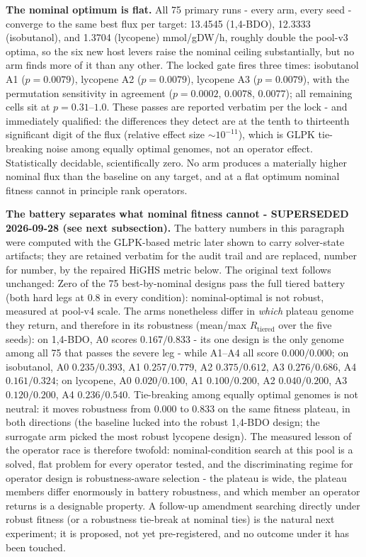\documentclass[12pt,a4paper]{article}
\begin{document}
\textbf{The nominal optimum is flat.} All 75 primary runs - every arm, every seed - converge to the same best flux per target: 13.4545 (1,4-BDO), 12.3333 (isobutanol), and 1.3704 (lycopene) mmol/gDW/h, roughly double the pool-v3 optima, so the six new host levers raise the nominal ceiling substantially, but no arm finds more of it than any other. The locked gate fires three times: isobutanol A1 ($p=0.0079$), lycopene A2 ($p=0.0079$), lycopene A3 ($p=0.0079$), with the permutation sensitivity in agreement ($p=0.0002$, $0.0078$, $0.0077$); all remaining cells sit at $p=0.31$--$1.0$. These passes are reported verbatim per the lock - and immediately qualified: the differences they detect are at the tenth to thirteenth significant digit of the flux (relative effect size $\sim 10^{-11}$), which is GLPK tie-breaking noise among equally optimal genomes, not an operator effect. Statistically decidable, scientifically zero. No arm produces a materially higher nominal flux than the baseline on any target, and at a flat optimum nominal fitness cannot in principle rank operators.

\textbf{The battery separates what nominal fitness cannot - SUPERSEDED 2026-09-28 (see next subsection).} The battery numbers in this paragraph were computed with the GLPK-based metric later shown to carry solver-state artifacts; they are retained verbatim for the audit trail and are replaced, number for number, by the repaired HiGHS metric below. The original text follows unchanged: Zero of the 75 best-by-nominal designs pass the full tiered battery (both hard legs at 0.8 in every condition): nominal-optimal is not robust, measured at pool-v4 scale. The arms nonetheless differ in \emph{which} plateau genome they return, and therefore in its robustness (mean/max $R_{\mathrm{tiered}}$ over the five seeds): on 1,4-BDO, A0 scores $0.167/0.833$ - its one design is the only genome among all 75 that passes the severe leg - while A1--A4 all score $0.000/0.000$; on isobutanol, A0 $0.235/0.393$, A1 $0.257/0.779$, A2 $0.375/0.612$, A3 $0.276/0.686$, A4 $0.161/0.324$; on lycopene, A0 $0.020/0.100$, A1 $0.100/0.200$, A2 $0.040/0.200$, A3 $0.120/0.200$, A4 $0.236/0.540$. Tie-breaking among equally optimal genomes is not neutral: it moves robustness from 0.000 to 0.833 on the same fitness plateau, in both directions (the baseline lucked into the robust 1,4-BDO design; the surrogate arm picked the most robust lycopene design). The measured lesson of the operator race is therefore twofold: nominal-condition search at this pool is a solved, flat problem for every operator tested, and the discriminating regime for operator design is robustness-aware selection - the plateau is wide, the plateau members differ enormously in battery robustness, and which member an operator returns is a designable property. A follow-up amendment searching directly under robust fitness (or a robustness tie-break at nominal ties) is the natural next experiment; it is proposed, not yet pre-registered, and no outcome under it has been touched.
\end{document}
